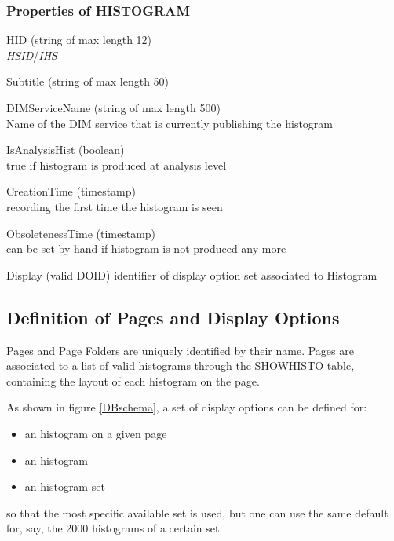 \documentclass{lhcbnote}
\begin{document}
\subsubsection{Properties of HISTOGRAM}
\begin{description}
\item{HID} (string of max length 12)\\
{\it HSID}/{\it IHS}
\item{Subtitle} (string of max length 50)
\item{DIMServiceName} (string of max length 500)\\
Name of the DIM service that is currently publishing the histogram 
\item{IsAnalysisHist} (boolean)\\
true if histogram is produced at analysis level
\item{CreationTime} (timestamp)\\
recording the first time the histogram is seen
\item{ObsoletenessTime} (timestamp)\\
can be set by hand if histogram is not produced any more 
\item{Display} (valid DOID)
identifier of display option set associated to Histogram 
\end{description}

\subsection{Definition of Pages and Display Options}
Pages and Page Folders are uniquely identified by their name. Pages
are associated to a list of valid histograms through the SHOWHISTO
table, containing the layout of each histogram on the page.

 As shown in figure \ref{DBschema}, a set of display options can
be defined for:
\begin{itemize}
\item an histogram on a given page
\item an histogram
\item an histogram set
\end{itemize}
so that the most specific available set is used, but one can use the
same default for, say, the 2000 histograms of a certain set. 
\end{document}
